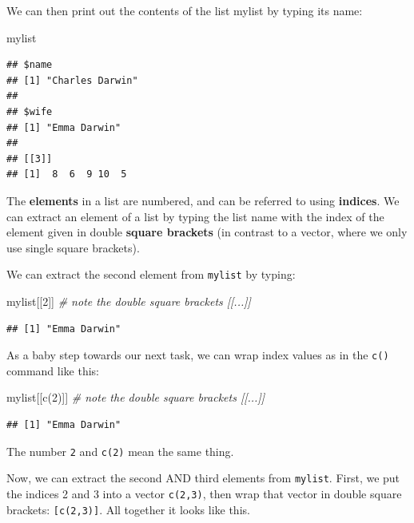 \documentclass[
]{book}
\newenvironment{Shaded}{\begin{snugshade}}{\end{snugshade}}
\newcommand{\CommentTok}[1]{\textcolor[rgb]{0.56,0.35,0.01}{\textit{#1}}}
\newcommand{\DecValTok}[1]{\textcolor[rgb]{0.00,0.00,0.81}{#1}}
\newcommand{\FunctionTok}[1]{\textcolor[rgb]{0.00,0.00,0.00}{#1}}
\newcommand{\NormalTok}[1]{#1}
\begin{document}
We can then print out the contents of the list mylist by typing its name:

\begin{Shaded}
\begin{Highlighting}[]
\NormalTok{mylist}
\end{Highlighting}
\end{Shaded}

\begin{verbatim}
## $name
## [1] "Charles Darwin"
## 
## $wife
## [1] "Emma Darwin"
## 
## [[3]]
## [1]  8  6  9 10  5
\end{verbatim}

The \textbf{elements} in a list are numbered, and can be referred to using \textbf{indices}. We can extract an element of a list by typing the list name with the index of the element given in double \textbf{square brackets} (in contrast to a vector, where we only use single square brackets).

We can extract the second element from \texttt{mylist} by typing:

\begin{Shaded}
\begin{Highlighting}[]
\NormalTok{mylist[[}\DecValTok{2}\NormalTok{]]  }\CommentTok{\# note the double square brackets [[...]]}
\end{Highlighting}
\end{Shaded}

\begin{verbatim}
## [1] "Emma Darwin"
\end{verbatim}

As a baby step towards our next task, we can wrap index values as in the \texttt{c()} command like this:

\begin{Shaded}
\begin{Highlighting}[]
\NormalTok{mylist[[}\FunctionTok{c}\NormalTok{(}\DecValTok{2}\NormalTok{)]]  }\CommentTok{\# note the double square brackets [[...]]}
\end{Highlighting}
\end{Shaded}

\begin{verbatim}
## [1] "Emma Darwin"
\end{verbatim}

The number \texttt{2} and \texttt{c(2)} mean the same thing.

Now, we can extract the second AND third elements from \texttt{mylist}. First, we put the indices 2 and 3 into a vector \texttt{c(2,3)}, then wrap that vector in double square brackets: \texttt{{[}c(2,3){]}}. All together it looks like this.
\end{document}
